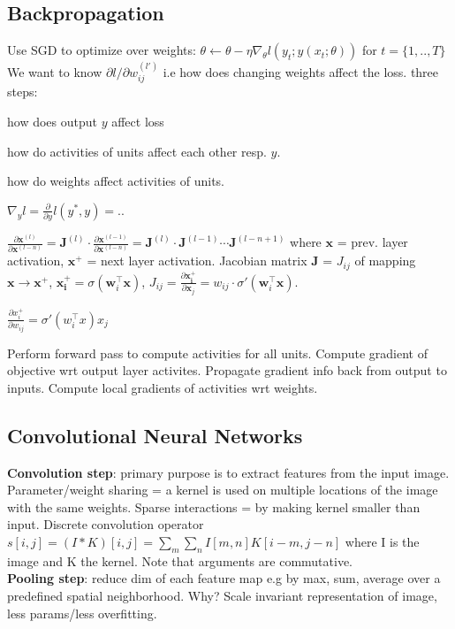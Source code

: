 \subsection*{Backpropagation}
\textbullet Use SGD to optimize over weights: $\theta \leftarrow \theta - \eta \nabla_\theta l(y_t;y(x_t;\theta))$ for $t=\{1,..,T\}$
\textbullet We want to know $\partial l / \partial w_{ij}^{(l')} $ i.e how does changing weights affect the loss.
\textbullet three steps: 
\begin{inparaenum} 
    \item how does output $y$ affect loss 
    \item how do activities of units affect each other resp. $y$. 
    \item how do weights affect activities of units. 
\end{inparaenum}
\textbullet 
\begin{inparaenum}
\item $\nabla_yl=\frac{\partial}{\partial y}l(y^*,y)=..$ 
\item $\frac{\partial\mathbf{x}^{(l)}}{\partial\mathbf{x}^{(l-n)}} = \mathbf{J}^{(l)}\cdot\frac{\partial\mathbf{x}^{(l-1)}}{\partial\mathbf{x}^{(l-n)}}=\mathbf{J}^{(l)}\cdot\mathbf{J}^{(l-1)}\cdots\mathbf{J}^{(l-n+1)}$ 
where $\mathbf{x}$ = prev. layer activation, $\mathbf{x^+}$ = next layer activation. Jacobian matrix $\mathbf{J}$ = $J_{ij}$ of mapping $\mathbf{x}\rightarrow\mathbf{x^+}$, $\mathbf{x_i^+} = \sigma(\mathbf{w}_i^\top\mathbf{x})$, $J_{ij} = \frac{\partial \mathbf{x_i^+}}{\partial \mathbf{x}_j} = w_{ij}\cdot\sigma'(\mathbf{w}_i^\top\mathbf{x})$. 
\item $\frac{\partial x_i^+}{\partial w_{ij}} = \sigma'(w_i^\top x)x_j$ 
\end{inparaenum}

\textbullet Perform forward pass to compute activities for all units. Compute gradient of objective wrt output layer activites. Propagate gradient info back from output to inputs. Compute local gradients of activities wrt weights.  
\subsection*{Convolutional Neural Networks}
\textbullet \textbf{Convolution step}: primary purpose is to extract features from the input image. Parameter/weight sharing = a kernel is used on multiple locations of the image with the same weights. Sparse interactions = by making kernel smaller than input. Discrete convolution operator $s[i,j]=(I*K)[i,j] = \sum_m \sum_n I[m,n]K[i-m,j-n]$ where I is the image and K the kernel. Note that arguments are commutative. \\
\textbullet \textbf{Pooling step}: reduce dim of each feature map e.g by max, sum, average over a predefined spatial neighborhood. Why? Scale invariant representation of image, less params/less overfitting. 
